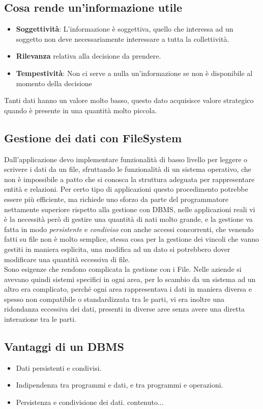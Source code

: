 \documentclass[a4paper,12pt]{report}
\begin{document}
\subsection{Cosa rende un'informazione utile}
\begin{itemize}
	\item \textbf{Soggettività}: L'informazione è soggettiva, quello che interessa ad un soggetto non deve necessariamente interessare a tutta la collettività.
	\item \textbf{Rilevanza} relativa alla decisione da prendere.
	\item \textbf{Tempestività}: Non ci serve a nulla un'informazione se non è disponibile al momento della decisione
\end{itemize}
Tanti dati hanno un valore molto basso, questo dato acquisisce valore strategico quando è presente in una quantità molto piccola.
\subsection{Gestione dei dati con FileSystem}
Dall'applicazione devo implementare funzionalità di basso livello per leggere o scrivere i dati da un file, sfruttando le funzionalità di un sistema operativo, che non è impossibile a patto che si conosca la struttura adeguata per rappresentare entità e relazioni. Per certo tipo di applicazioni questo procedimento potrebbe essere più efficiente, ma richiede uno sforzo da parte del programmatore nettamente superiore rispetto alla gestione con DBMS, nelle applicazioni reali vi è la necessità però di gestire una quantità di nati molto grande, e la gestione va fatta in modo \textit{persistente} e \textit{condiviso} con anche accessi concorrenti, che venendo fatti su file non è molto semplice, stessa cosa per la gestione dei vincoli che vanno gestiti in maniera esplicita, una modifica ad un dato si potrebbero dover modificare una quantità eccessiva di file.\\
Sono esigenze che rendono complicata la gestione con i File.
Nelle aziende si avevano quindi sistemi specifici in ogni area, per lo scambio da un sistema ad un altro era complicato, perché ogni area rappresentava i dati in maniera diversa e spesso non compatibile o standardizzata tra le parti, vi era inoltre una ridondanza eccessiva dei dati, presenti in diverse aree senza avere una diretta interazione tra le parti.
\subsection{Vantaggi di un DBMS}
\begin{itemize}
	\item Dati persistenti e condivisi.
	\item Indipendenza tra programmi e dati, e tra programmi e operazioni.
	\item Persistenza e condivisione dei dati.
	contenuto...
\end{itemize}
\end{document}
